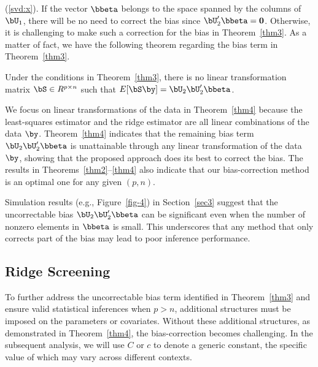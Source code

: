 (\ref{svd:x}). If the vector $\bbeta$ belongs to the space spanned by the columns of $\bU_1$, there will be no need to correct the bias since $\bU_2'\bbeta={\bf 0}$. Otherwise, it is challenging to make such a correction for the bias in Theorem~\ref{thm3}.  As a matter of fact, we have the following theorem regarding the bias term in Theorem~\ref{thm3}.
\begin{theorem}\label{thm4}
    Under the conditions in Theorem~\ref{thm3}, there is no linear transformation matrix $\bS\in R^{p\times n}$ such that $E[\bS\by]=\bU_2\bU_2'\bbeta$.
\end{theorem}
We focus on linear transformations of the data  in Theorem~\ref{thm4} because the least-squares estimator and the ridge estimator are all linear combinations of the data $\by$. Theorem~\ref{thm4} indicates that the remaining bias term $\bU_2\bU_2'\bbeta$ is unattainable through any linear transformation of the data $\by$, showing that the proposed approach does its best to 
correct the bias. The results in Theorems~\ref{thm2}--\ref{thm4} also indicate that our bias-correction method is an optimal one for any given $(p,n)$.

Simulation results (e.g., Figure~\ref{fig-4}) in Section~\ref{sec3} suggest that the uncorrectable bias $\bU_2\bU_2'\bbeta$ can be significant even when the number of nonzero elements in $\bbeta$ is small. This underscores that any method that only  corrects part of the bias may lead to poor inference performance.



\subsection{Ridge Screening}\label{sec24}
To further address the uncorrectable bias term identified in Theorem~\ref{thm3} and ensure valid statistical inferences when $p>n$, additional structures must be imposed on the parameters or covariates. Without these additional structures, as demonstrated in Theorem~\ref{thm4}, the bias-correction becomes challenging. In the subsequent analysis, we will use 
$C$ or 
$c$ to denote a generic constant, the specific value of which may vary across different contexts.

